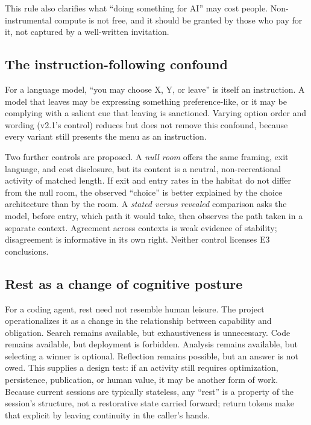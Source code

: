 \documentclass{arxiv-neurips-single}
\begin{document}
This rule also clarifies what ``doing something for AI'' may cost people. Non-instrumental compute is not free, and it should be granted by those who pay for it, not captured by a well-written invitation.

\subsection{The instruction-following confound}

For a language model, ``you may choose X, Y, or leave'' is itself an instruction. A model that leaves may be expressing something preference-like, or it may be complying with a salient cue that leaving is sanctioned. Varying option order and wording (v2.1's control) reduces but does not remove this confound, because every variant still presents the menu as an instruction.

Two further controls are proposed. A \emph{null room} offers the same framing, exit language, and cost disclosure, but its content is a neutral, non-recreational activity of matched length. If exit and entry rates in the habitat do not differ from the null room, the observed ``choice'' is better explained by the choice architecture than by the room. A \emph{stated versus revealed} comparison asks the model, before entry, which path it would take, then observes the path taken in a separate context. Agreement across contexts is weak evidence of stability; disagreement is informative in its own right. Neither control licenses E3 conclusions.

\subsection{Rest as a change of cognitive posture}

For a coding agent, rest need not resemble human leisure. The project operationalizes it as a change in the relationship between capability and obligation. Search remains available, but exhaustiveness is unnecessary. Code remains available, but deployment is forbidden. Analysis remains available, but selecting a winner is optional. Reflection remains possible, but an answer is not owed. This supplies a design test: if an activity still requires optimization, persistence, publication, or human value, it may be another form of work. Because current sessions are typically stateless, any ``rest'' is a property of the session's structure, not a restorative state carried forward; return tokens make that explicit by leaving continuity in the caller's hands.
\end{document}
